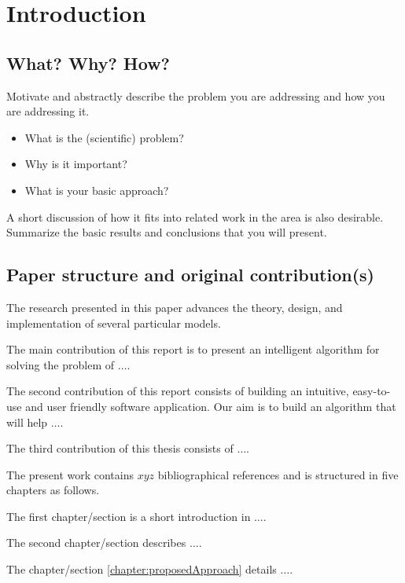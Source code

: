 

\chapter{Introduction}
\label{chapter:introduction}

\section{What? Why? How?}
\label{section:what}

Motivate and abstractly describe the problem you are addressing and how you are addressing it. 
\begin{itemize}
	\item What is the (scientific) problem? 
	\item Why is it important? 
	\item What is your basic approach? 
\end{itemize}

A short discussion of how it fits into related work in the area is also desirable. Summarize the basic results and conclusions that you will present. 


\section{Paper structure and original contribution(s)}
\label{section:structure}

The research presented in this paper advances the theory, design, and implementation of several particular models. 

The main contribution of this report is to present an intelligent algorithm for solving the problem of $\ldots$.

The second contribution of this report consists of building an intuitive, easy-to-use and user
friendly software application. Our aim is to build an algorithm that will help $\ldots$.

The third contribution of this thesis consists of $\ldots$.


The present work contains $xyz$ bibliographical references and is structured in five chapters as follows.

The first chapter/section is a short introduction in $\ldots$.

The second chapter/section describes $\ldots$.

The chapter/section \ref{chapter:proposedApproach} details $\ldots$.


